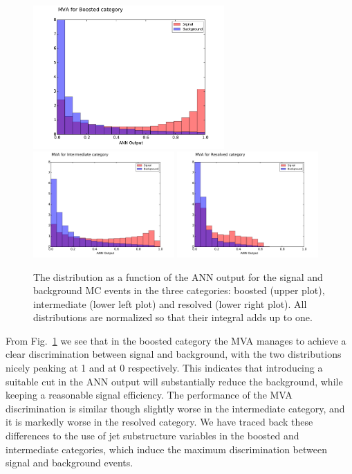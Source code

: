 \begin{figure}[t]
\begin{center}
\includegraphics[width=0.65\textwidth]{plots/Boosted_disc.pdf}
\includegraphics[width=0.48\textwidth]{plots/Intermediate_disc.pdf}
\includegraphics[width=0.48\textwidth]{plots/Resolved_disc.pdf}
\caption{\small The distribution as a function of the ANN output
  for the signal and background MC events in the three categories:
  boosted (upper plot), intermediate (lower left plot) and
  resolved (lower right plot).
  All distributions are normalized so that their integral
  adds up to one.
}
\label{fig:nnresponse}
\end{center}
\end{figure}

From Fig.~\ref{fig:nnresponse} we see that in the boosted category the MVA manages
to achieve a clear discrimination between signal and background, with the two distributions
nicely peaking at 1 and at 0 respectively.
%
This indicates that introducing a suitable cut in the ANN output will substantially reduce the background,
while keeping a reasonable signal efficiency.
%
The performance of the MVA discrimination is similar though slightly worse in the intermediate
category, and it is markedly worse in the resolved category.
%
We have traced back these differences to the use of jet substructure variables
in the boosted and intermediate categories, which induce the maximum
discrimination between signal and background events.



